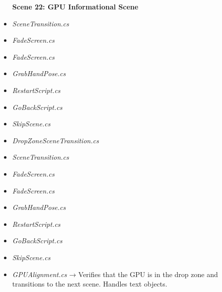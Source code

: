 \documentclass[10pt,twocolumn]{article}
\begin{document}
\begin{itemize}
    \textbf{Scene 22:  GPU Informational Scene}\\
    \item \textit{SceneTransition.cs}\\
    \item \textit{FadeScreen.cs}
\end{itemize}

\begin{itemize}
    \textbf{Scene 23:  GPU Placement Scene}\\
    \item \textit{FadeScreen.cs}\\
    \item \textit{GrabHandPose.cs}\\
    \item \textit{RestartScript.cs}\\
    \item \textit{GoBackScript.cs}\\
    \item \textit{SkipScene.cs}\\
    \item \textit{DropZoneSceneTransition.cs}
\end{itemize}

\begin{itemize}
    \textbf{Scene 24:  GPU Motions Scene 1}\\
    \item \textit{SceneTransition.cs}\\
    \item \textit{FadeScreen.cs}
\end{itemize}

\begin{itemize}
    \textbf{Scene 25:  GPU Install Scene 1}\\
    \item \textit{FadeScreen.cs}\\
    \item \textit{GrabHandPose.cs}\\
    \item \textit{RestartScript.cs}\\
    \item \textit{GoBackScript.cs}\\
    \item \textit{SkipScene.cs}\\
    \item \textit{GPUAlignment.cs} → Verifies that the GPU is in the drop zone and transitions to the next scene. Handles text objects. 
\end{itemize}
\end{document}
